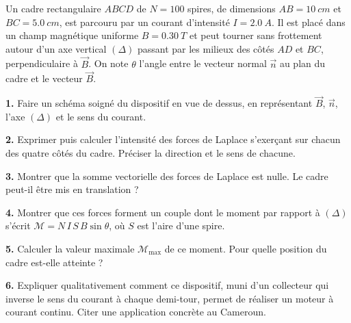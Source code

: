 \documentclass[11pt]{article}
\begin{document}
\begin{exercice}
Un cadre rectangulaire $ABCD$ de $N = 100$ spires, de dimensions $AB = \SI{10}{cm}$ et $BC = \SI{5,0}{cm}$, est parcouru par un courant d'intensité $I = \SI{2,0}{A}$. Il est placé dans un champ magnétique uniforme $B = \SI{0,30}{T}$ et peut tourner sans frottement autour d'un axe vertical $(\Delta)$ passant par les milieux des côtés $AD$ et $BC$, perpendiculaire à $\vec{B}$. On note $\theta$ l'angle entre le vecteur normal $\vec{n}$ au plan du cadre et le vecteur $\vec{B}$.

\textbf{1.} Faire un schéma soigné du dispositif en vue de dessus, en représentant $\vec{B}$, $\vec{n}$, l'axe $(\Delta)$ et le sens du courant.

\textbf{2.} Exprimer puis calculer l'intensité des forces de Laplace s'exerçant sur chacun des quatre côtés du cadre. Préciser la direction et le sens de chacune.

\textbf{3.} Montrer que la somme vectorielle des forces de Laplace est nulle. Le cadre peut-il être mis en translation ?

\textbf{4.} Montrer que ces forces forment un couple dont le moment par rapport à $(\Delta)$ s'écrit $\mathcal{M} = N\, I\, S\, B \sin\theta$, où $S$ est l'aire d'une spire.

\textbf{5.} Calculer la valeur maximale $\mathcal{M}_{\max}$ de ce moment. Pour quelle position du cadre est-elle atteinte ?

\textbf{6.} Expliquer qualitativement comment ce dispositif, muni d'un collecteur qui inverse le sens du courant à chaque demi-tour, permet de réaliser un moteur à courant continu. Citer une application concrète au Cameroun.
\end{exercice}
\end{document}
